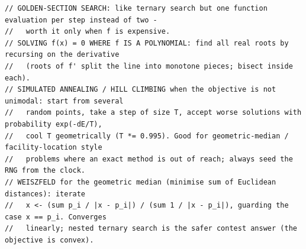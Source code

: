 \documentclass[9pt,a4paper,twocolumn]{extarticle}
\begin{document}
\begin{lstlisting}
// GOLDEN-SECTION SEARCH: like ternary search but one function evaluation per step instead of two -
//   worth it only when f is expensive.
// SOLVING f(x) = 0 WHERE f IS A POLYNOMIAL: find all real roots by recursing on the derivative
//   (roots of f' split the line into monotone pieces; bisect inside each).
// SIMULATED ANNEALING / HILL CLIMBING when the objective is not unimodal: start from several
//   random points, take a step of size T, accept worse solutions with probability exp(-dE/T),
//   cool T geometrically (T *= 0.995). Good for geometric-median / facility-location style
//   problems where an exact method is out of reach; always seed the RNG from the clock.
// WEISZFELD for the geometric median (minimise sum of Euclidean distances): iterate
//   x <- (sum p_i / |x - p_i|) / (sum 1 / |x - p_i|), guarding the case x == p_i. Converges
//   linearly; nested ternary search is the safer contest answer (the objective is convex).
\end{lstlisting}

\filbreak
\end{document}
